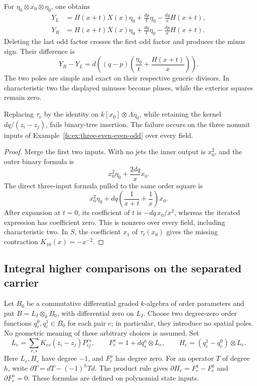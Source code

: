 \begin{example}\label{fs:ex:three-odd}
For \(\eta_0\otimes x_0\otimes\eta_0\), one obtains
\[
 \begin{aligned}
 Y_L&=H(x+t)X(x)\eta_0+\frac{dp}{t}\eta_0-
                                      \frac{dq}{x}H(x+t),\\
 Y_R&=H(x+t)X(x)\eta_0+\frac{dq}{t}\eta_0-
                                      \frac{dp}{x}H(x+t).
 \end{aligned}
\]
Deleting the last odd factor crosses the first odd factor and produces
the minus sign.  Their difference is
\[
 Y_R-Y_L=d\left((q-p)
                  \left(\frac{\eta_0}{t}+\frac{H(x+t)}{x}\right)\right).
\]
The two poles are simple and exact on their respective generic divisors.
In characteristic two the displayed minuses become pluses, while
the exterior squares remain zero.
\end{example}

\begin{proposition}\label{fs:prop:jet-obstruction}
Replacing \(\tau_v\) by the identity on \(k[x_0]\otimes\Lambda\eta_0\),
while retaining the kernel \(dq/(z_i-z_j)\), fails binary-tree insertion.
The failure occurs on the three nonunit inputs of
Example~\ref{fs:ex:three-even-even-odd} over every field.
\end{proposition}

\begin{proof}
Merge the first two inputs.  With no jets the inner output is
\(x_0^2\), and the outer binary formula is
\[
 x_0^2\eta_0+\frac{2dq}{x}x_0.
\]
The direct three-input formula pulled to the same order square is
\[
 x_0^2\eta_0+dq\left(\frac1{x+t}+\frac1x\right)x_0.
\]
After expansion at \(t=0\), its coefficient of \(t\) is
\(-dq\,x_0/x^2\), whereas the iterated expression has coefficient
zero.  This is nonzero over every field, including characteristic two.
In \(S\), the coefficient \(x_1\) of \(\tau_t(x_0)\) gives
the missing contraction \(K_{10}(x)=-x^{-2}\).
\end{proof}

\subsection{Integral higher comparisons on the separated carrier}

Let \(B_0\) be a commutative differential graded \(k\)-algebra
of order parameters and put \(B=L_I\otimes_k B_0\), with
differential zero on \(L_I\).  Choose two degree-zero order functions
\(q_e^0,q_e^1\in B_0\) for each pair \(e\); in particular,
they introduce no spatial poles.  No geometric meaning
of these arbitrary choices is assumed.  Set
\[
 L_e=\sum_{r,s}K_{rs}(z_i-z_j)P_{ij}^{rs},\qquad
 F_e^a=1+dq_e^a\otimes L_e,\qquad
 H_e=(q_e^1-q_e^0)\otimes L_e.
\]
Here \(L_e,H_e\) have degree \(-1\), and \(F_e^a\) has degree zero.
For an operator \(T\) of degree \(h\), write
\(\partial T=dT-(-1)^hTd\).  The product rule gives
\(\partial H_e=F_e^1-F_e^0\) and \(\partial F_e^a=0\).
These formulas are defined on polynomial state inputs.

